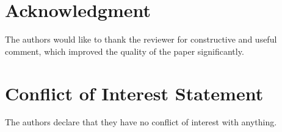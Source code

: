 \documentclass[preprint,12pt]{elsarticle}
\theoremstyle{definition}
\begin{document}
\section*{Acknowledgment}
The authors would like to thank the reviewer for constructive and useful comment, which improved the quality of the paper significantly. 

\section{Conflict of Interest Statement}
 The authors declare that they have no
 conflict of interest with anything.

 

\end{document}
